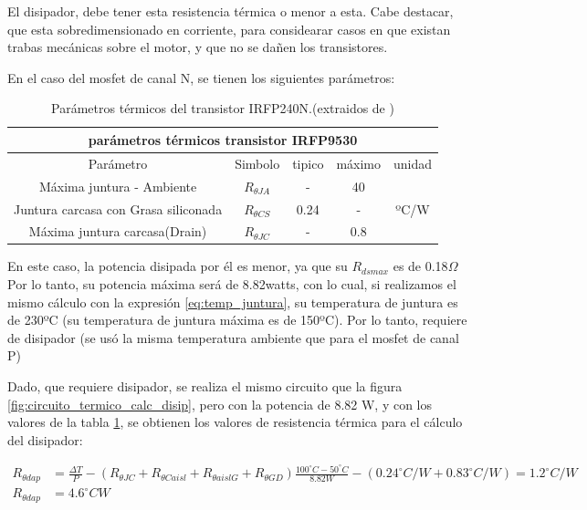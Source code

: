 El disipador, debe tener esta resistencia térmica o menor a esta. Cabe destacar, que esta sobredimensionado en corriente, para considearar casos en que existan trabas mecánicas sobre el motor, y que no se dañen los transistores. 

En el caso del mosfet de canal N, se tienen los siguientes parámetros:


\begin{table}[ht!]
	\centering
	\begin{tabular}{|c|c|c|c|c|}
		\hline 
		\multicolumn{5}{|c|}{parámetros térmicos transistor IRFP9530}\\ \hline 
		Parámetro & Simbolo & tipico & máximo & unidad \\ \hline 
		Máxima juntura - Ambiente &$R_{\theta JA}$ & - &40 & \multirow{3}{*}{ºC/W} \\ \cline{1-4} 
		Juntura carcasa con Grasa siliconada &$R_{\theta CS}$ & 0.24 &-& \\ \cline{1-4} 
		Máxima juntura carcasa(Drain) &$R_{\theta JC}$ & - &0.8& \\ \hline
	\end{tabular}
	\caption{Parámetros térmicos del transistor IRFP240N.(extraidos de \cite{IRFP240})} 
	\label{tab:par_ter_irfp240}
\end{table}


En este caso, la potencia disipada por él es menor, ya que su $R_{dsmax}$ es de 0.18$\Omega$ Por lo tanto, su potencia máxima será de 8.82watts, con lo cual, si realizamos el mismo cálculo con la expresión \ref{eq:temp_juntura}, su temperatura de juntura es de 230ºC (su temperatura de juntura máxima es de 150ºC). Por lo tanto, requiere de disipador (se usó la misma temperatura ambiente que para el mosfet de canal P)

Dado, que requiere disipador, se realiza el mismo circuito que la figura \ref{fig:circuito_termico_calc_disip}, pero con la potencia de 8.82 W, y con los valores de la tabla \ref{tab:par_ter_irfp240}, se obtienen los valores de resistencia térmica para el cálculo del disipador: 

\begin{align} 
	R_{\theta dap}& = \frac{\Delta T}{P} - ( R_{\theta JC}+ R_{\theta Caisl} + R_{\theta aislG} + R_{\theta GD}) \frac{100^\circ C - 50^\circ C }{8.82 W} - (0.24^\circ C/ W + 0.83^\circ C/ W ) = 1.2^\circ C/W \nonumber	\\
	R_{\theta dap} &=  4.6^\circ C W \label{eq:val:r_term}
\end{align} 

